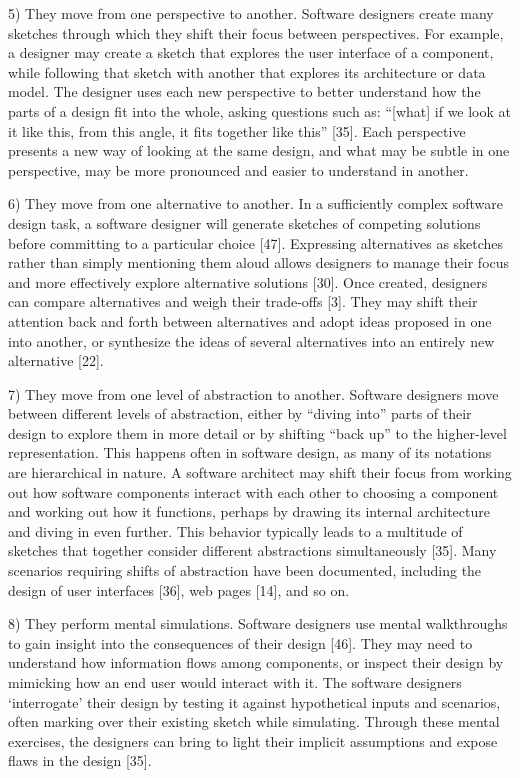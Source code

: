 5)	They move from one perspective to another. Software designers create many sketches through which they shift their focus between perspectives. For example, a designer may create a sketch that explores the user interface of a component, while following that sketch with another that explores its architecture or data model. The designer uses each new perspective to better understand how the parts of a design fit into the whole, asking questions such as: “[what] if we look at it like this, from this angle, it fits together like this” [35]. Each perspective presents a new way of looking at the same design, and what may be subtle in one perspective, may be more pronounced and easier to understand in another. 

6)	They move from one alternative to another. In a sufficiently complex software design task, a software designer will generate sketches of competing solutions before committing to a particular choice [47]. Expressing alternatives as sketches rather than simply mentioning them aloud allows designers to manage their focus and more effectively explore alternative solutions [30]. Once created, designers can compare alternatives and weigh their trade-offs [3]. They may shift their attention back and forth between alternatives and adopt ideas proposed in one into another, or synthesize the ideas of several alternatives into an entirely new alternative [22]. 

7)	They move from one level of abstraction to another. Software designers move between different levels of abstraction, either by “diving into” parts of their design to explore them in more detail or by shifting “back up” to the higher-level representation. This happens often in software design, as many of its notations are hierarchical in nature. A software architect may shift their focus from working out how software components interact with each other to choosing a component and working out how it functions, perhaps by drawing its internal architecture and diving in even further. This behavior typically leads to a multitude of sketches that together consider different abstractions simultaneously [35]. Many scenarios requiring shifts of abstraction have been documented, including the design of user interfaces [36], web pages [14], and so on.

8)	They perform mental simulations. Software designers use mental walkthroughs to gain insight into the consequences of their design [46]. They may need to understand how information flows among components, or inspect their design by mimicking how an end user would interact with it. The software designers ‘interrogate’ their design by testing it against hypothetical inputs and scenarios, often marking over their existing sketch while simulating. Through these mental exercises, the designers can bring to light their implicit assumptions and expose flaws in the design [35]. 

